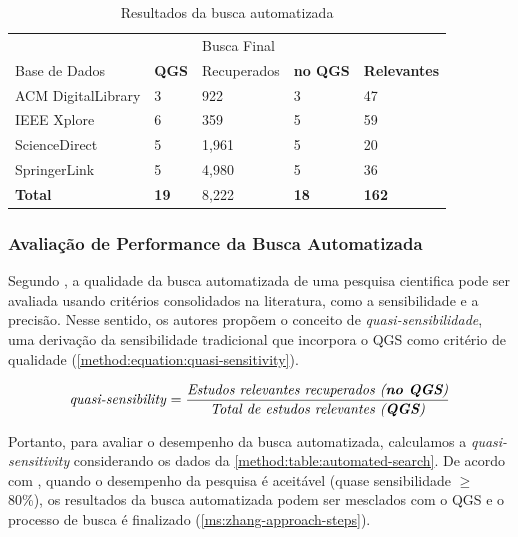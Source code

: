 \begin{table}[htbp]
\centering
\caption{Resultados da busca automatizada}
\label{method:table:automated-search}
\begin{tabular}{lllll}
\hline
 &  & Busca Final &                 &                   \\ \cline{3-5} 
Base de Dados & \textbf{QGS} & Recuperados    & \textbf{no QGS} & \textbf{Relevantes} \\ \hline
ACM DigitalLibrary & 3            & 922          & 3               & 47                \\
IEEE Xplore        & 6            & 359          & 5               & 59                \\
ScienceDirect      & 5            & 1,961        & 5               & 20                \\
SpringerLink       & 5            & 4,980        & 5               & 36                \\
\textbf{Total}   & \textbf{19}  & 8,222        & \textbf{18}     & \textbf{162}      \\ \hline
\end{tabular}
\fautor
\end{table}

\subsubsection{Avaliação de Performance da Busca Automatizada}
\label{ms:conducao-busca-performance}

Segundo , a qualidade da busca automatizada de uma pesquisa cientifica pode ser avaliada usando critérios consolidados na literatura, como a sensibilidade e a precisão. Nesse sentido, os autores propõem o conceito de \textit{quasi-sensibilidade}, uma derivação da sensibilidade tradicional que incorpora o QGS como critério de qualidade (\autoref{method:equation:quasi-sensitivity}).

\begin{equation}
\label{method:equation:quasi-sensitivity}
\text{\textit{quasi-sensibility}} = \frac{\text{\textit{Estudos relevantes recuperados (\textbf{no QGS})}}}{\text{\textit{Total de estudos relevantes (\textbf{QGS})}}}
\end{equation}

Portanto, para avaliar o desempenho da busca automatizada, calculamos a \textit{quasi-sensitivity} considerando os dados da \autoref{method:table:automated-search}. De acordo com , quando o desempenho da pesquisa é aceitável (quase sensibilidade $\geq$ 80\%), os resultados da busca automatizada podem ser mesclados com o QGS e o processo de busca é finalizado (\autoref{ms:zhang-approach-steps}).

